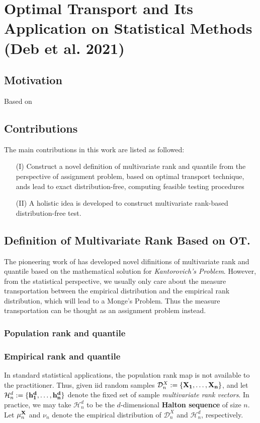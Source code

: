 \chapter{Optimal Transport and Its Application on Statistical Methods (Deb et al. 2021)}
\section{Motivation}
Based on \cite{chernozhukov2017monge} 
\section{Contributions}
The main contributions in this work are listed as followed:
\begin{enumerate}
	\item[(I)] Construct a novel definition of multivariate rank and quantile from the perspective of assignment problem, based on optimal transport technique, ands lead to exact distribution-free, computing feasible testing procedures
	\item[(II)] A holistic idea is developed to construct multivariate rank-based distribution-free test.
\end{enumerate}

\section{Definition of Multivariate Rank Based on OT.}

The pioneering work of \cite{chernozhukov2017monge} has developed novel difinitions of multivariate rank and quantile based on the mathematical solution for \textit{Kantorovich's Problem}. However, from the statistical perspective, we usually only care about the measure transportation between the empirical distribution and the empirical rank distribution, which will lead to a Monge's Problem. Thus the measure transportation can be thought as an assignment problem instead. 

\subsection{Population rank and quantile}

\subsection{Empirical rank and quantile}
In standard statistical applications, the population rank map is not available to the practitioner. Thus, given iid random samples $\mathcal{D}_n^X :=\{\bf{X}_1, \dots, \bf{X}_n\}$, and let $ \mathcal{H}_n^d:=\{\bf{h}_1^d, \dots, \bf{h}_n^d\}$ denote the fixed set of sample \textit{multivariate rank vectors}. In practice, we may take $\mathcal{H}_n^d$ to be the $d$-dimensional {\bf Halton sequence} of size $n$. Let $\mu_n^{\bf{X}}$ and $\nu_n$ denote the empirical distribution of $\mathcal{D}_n^X$ and $\mathcal{H}_n^d$, respectively. 

